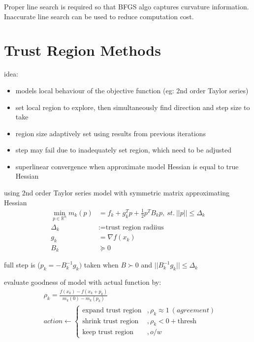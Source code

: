 \documentclass[8pt,letter]{article}
\newcommand{\R}{\mathbb{R}}
\begin{document}
\begin{multicols*}{2}
  Proper line search is required so that BFGS algo captures curvature information.\\
  
  Inaccurate line search can be used to reduce computation cost.
  \vfill\null
  
  
  \section{Trust Region Methods}
  idea:
  \begin{itemize}
  \item models local behaviour of the objective function (eg: 2nd order Taylor series)
  \item set local region to explore, then simultaneously find direction and step size to take
  \item region size adaptively set using results from previous iterations
  \item step may fail due to inadequately set region, which need to be adjusted
  \item superlinear convergence when approximate model Hessian is equal to true Hessian
  \end{itemize}

  using 2nd order Taylor series model with symmetric matrix approximating Hessian
  \begin{align*}
    \min_{p \in \R^n} m_k(p) & = f_k + g_k^Tp + \frac{1}{2}p^TB_kp,\ st.\ ||p||\leq \Delta_k\\
    \Delta_k & :=\text{trust region radiius}\\
    g_k & =\nabla f(x_k)\\
    B_k & \succeq 0
  \end{align*}
  
  full step is ($p_k=-B_k^{-1}g_k)$ taken when $B\succ 0 $ and $||B_k^{-1} g_k|| \leq \Delta_k$

  evaluate goodness of model with actual function by:
  \begin{align*}
    &\rho_k = \frac{f(x_k)-f(x_k+p_k)}{m_k(0)-m_k(p_k)}\\
    &action \leftarrow
      \begin{cases}
        \text{expand trust region} &, \rho_k \approx 1\ (agreement)\\
        \text{shrink trust region} &, \rho_k  < 0 + \text{thresh}\\
        \text{keep trust region} &, o/w
      \end{cases}  
  \end{align*}


\end{multicols*}
\end{document}
